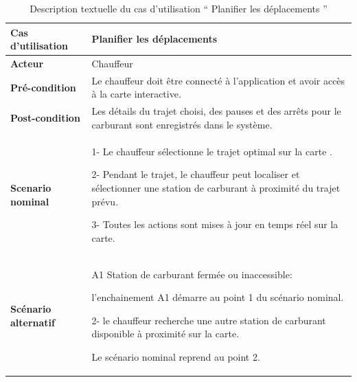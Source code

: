 \begin{table}[htbp]
    \centering
    \renewcommand{\arraystretch}{1.5}
    \begin{tabular}{|p{4cm}|p{9.5cm}|}
        \hline
        \textbf{Cas d'utilisation}   & Planifier les déplacements                                                                                 \\
        \hline
        \textbf{Acteur}              & Chauffeur                                                                                                  \\
        \hline
        \textbf{Pré-condition}       & Le chauffeur doit être connecté à l'application et avoir accès à la carte interactive.                     \\


        \hline
        \textbf{Post-condition}      & Les détails du trajet choisi, des pauses et des arrêts pour le carburant sont enregistrés dans le système. \\
        \hline
        \textbf{Scenario nominal}    & 1- Le chauffeur sélectionne le trajet optimal sur la carte .\newline

        2- Pendant le trajet, le chauffeur peut localiser et sélectionner une station de carburant à proximité du trajet prévu.\newline

        3- Toutes les actions sont mises à jour en temps réel sur la carte.                                                                       \\
        \hline
        \textbf{Scénario alternatif} & A1 Station de carburant fermée ou inaccessible: \newline

        l'enchainement A1 démarre au point 1 du scénario nominal.\newline

        2- le chauffeur recherche une autre station de carburant disponible à proximité sur la carte. \newline

        Le scénario nominal reprend au point 2.                                                                                                   \\

        \hline
    \end{tabular}
    \caption{Description textuelle du cas d’utilisation “ Planifier les déplacements ”}

\end{table}


